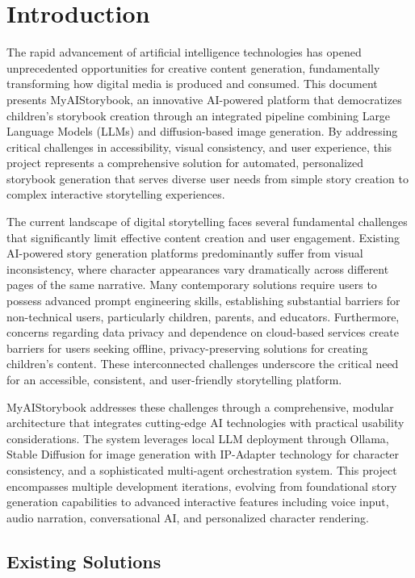 \chapter{Introduction}
\label{sec:introduction}

The rapid advancement of artificial intelligence technologies has opened unprecedented opportunities for creative content generation, fundamentally transforming how digital media is produced and consumed. This document presents MyAIStorybook, an innovative AI-powered platform that democratizes children's storybook creation through an integrated pipeline combining Large Language Models (LLMs) and diffusion-based image generation. By addressing critical challenges in accessibility, visual consistency, and user experience, this project represents a comprehensive solution for automated, personalized storybook generation that serves diverse user needs from simple story creation to complex interactive storytelling experiences.

The current landscape of digital storytelling faces several fundamental challenges that significantly limit effective content creation and user engagement. Existing AI-powered story generation platforms predominantly suffer from visual inconsistency, where character appearances vary dramatically across different pages of the same narrative. Many contemporary solutions require users to possess advanced prompt engineering skills, establishing substantial barriers for non-technical users, particularly children, parents, and educators. Furthermore, concerns regarding data privacy and dependence on cloud-based services create barriers for users seeking offline, privacy-preserving solutions for creating children's content. These interconnected challenges underscore the critical need for an accessible, consistent, and user-friendly storytelling platform.

MyAIStorybook addresses these challenges through a comprehensive, modular architecture that integrates cutting-edge AI technologies with practical usability considerations. The system leverages local LLM deployment through Ollama, Stable Diffusion for image generation with IP-Adapter technology for character consistency, and a sophisticated multi-agent orchestration system. This project encompasses multiple development iterations, evolving from foundational story generation capabilities to advanced interactive features including voice input, audio narration, conversational AI, and personalized character rendering.

\section{Existing Solutions}

